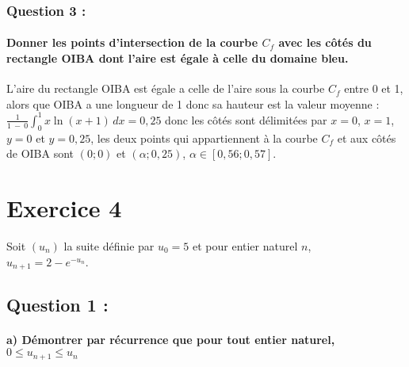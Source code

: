 \documentclass[a4paper, 12pt]{article}
\begin{document}
{}
\subsubsection*{Question 3 :}
\paragraph*{Donner les points d'intersection de la courbe $C_f$ avec les côtés du rectangle OIBA dont l'aire est égale à celle du domaine bleu.\\[5mm]}

L'aire du rectangle OIBA est égale a celle de l'aire sous la courbe $C_f$ entre 0 et 1, alors que OIBA a une longueur de 1 donc sa hauteur est la valeur moyenne :
\\
$\frac{1}{1\ -\ 0}\displaystyle \int_0^1 x\ln{\left(x+1\right)} \,dx = 0,25$ donc les côtés sont délimitées par $x=0$, $x=1$, $y=0$ et $y=0,25$, 
les deux points qui appartiennent à la courbe $C_f$ et aux côtés de OIBA sont $(0;0)$ et $(\alpha;0,25)$, $\alpha \in[0,56;0,57]$.

{}
\section*{Exercice 4}

Soit $(u_n)$ la suite définie par $u_0 = 5$ et pour entier naturel $n$, \\ $u_{n+1} = 2 - e^{-u_n}$.

{}
\subsection*{Question 1 :}

{}
\paragraph*{a) Démontrer par récurrence que pour tout entier naturel,\\ $0 \leq u_{n+1} \leq u_n$\\[5mm]}
\end{document}
